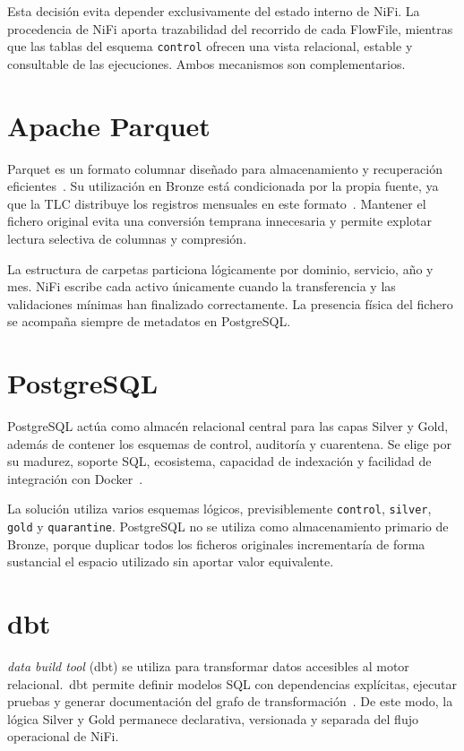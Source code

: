 Esta decisión evita depender exclusivamente del estado interno de NiFi. La procedencia de NiFi aporta trazabilidad del recorrido de cada FlowFile, mientras que las tablas del esquema \texttt{control} ofrecen una vista relacional, estable y consultable de las ejecuciones. Ambos mecanismos son complementarios.

\section{Apache Parquet}

Parquet es un formato columnar diseñado para almacenamiento y recuperación eficientes~\cite{parquet_docs}. Su utilización en Bronze está condicionada por la propia fuente, ya que la TLC distribuye los registros mensuales en este formato~\cite{nyctlc_tripdata}. Mantener el fichero original evita una conversión temprana innecesaria y permite explotar lectura selectiva de columnas y compresión.

La estructura de carpetas particiona lógicamente por dominio, servicio, año y mes. NiFi escribe cada activo únicamente cuando la transferencia y las validaciones mínimas han finalizado correctamente. La presencia física del fichero se acompaña siempre de metadatos en PostgreSQL\@.

\section{PostgreSQL}

PostgreSQL actúa como almacén relacional central para las capas Silver y Gold, además de contener los esquemas de control, auditoría y cuarentena. Se elige por su madurez, soporte SQL, ecosistema, capacidad de indexación y facilidad de integración con Docker~\cite{postgres_docs}.

La solución utiliza varios esquemas lógicos, previsiblemente \texttt{control}, \texttt{silver}, \texttt{gold} y \texttt{quarantine}. PostgreSQL no se utiliza como almacenamiento primario de Bronze, porque duplicar todos los ficheros originales incrementaría de forma sustancial el espacio utilizado sin aportar valor equivalente.

\section{dbt}

\textit{data build tool} (dbt) se utiliza para transformar datos accesibles al motor relacional.\ dbt permite definir modelos SQL con dependencias explícitas, ejecutar pruebas y generar documentación del grafo de transformación~\cite{dbt_docs}. De este modo, la lógica Silver y Gold permanece declarativa, versionada y separada del flujo operacional de NiFi.

